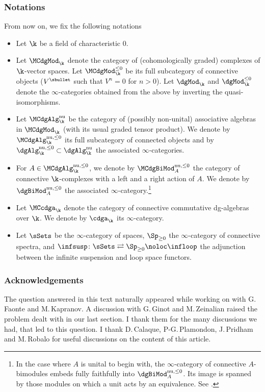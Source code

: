 \subsubsection*{Notations}
From now on, we fix the following notations
\begin{itemize}
\item Let $\k$ be a field of characteristic $0$.
\item Let $\MCdgMod_\k$ denote the category of (cohomologically graded) complexes of $\k$\nobreakdash-vector spaces. Let $\MCdgMod_\k^{\leq 0}$ be its full subcategory of connective objects (\ie $V^\sbullet$ such that $V^n = 0$ for $n > 0$).
Let $\dgMod_\k$ and $\dgMod_\k^{\leq 0}$ denote the $\infty$-categories obtained from the above by inverting the quasi-isomorphisms.
\item Let $\MCdgAlg_\k^{\mathrm{nu}}$ be the category of (possibly non-unital) associative algebras in $\MCdgMod_\k$ (with its usual graded tensor product). We denote by $\MCdgAlg_\k^{\mathrm{nu},\leq 0}$ its full subcategory of connected objects and by $\dgAlg^{\mathrm{nu},\leq 0}_\k \subset \dgAlg_\k^{\mathrm{nu}}$ the associated $\infty$\nobreakdash-categories.
\item For $A \in \MCdgAlg_\k^{\mathrm{nu},\leq 0}$, we denote by $\MCdgBiMod_A^{\mathrm{nu},\leq 0}$ the category of connective $\k$-complexes with a left and a right action of $A$. We denote by $\dgBiMod^{\mathrm{nu},\leq 0}_A$ the associated $\infty$-category.\footnote{In the case where $A$ is unital to begin with, the $\infty$-category of connective $A$-bimodules embeds fully faithfully into $\dgBiMod^{\mathrm{nu},\leq 0}_A$. Its image is spanned by those modules on which a unit acts by an equivalence. See \cite[5.4.3.5 \& 5.4.3.14]{lurie:halg}.}
\item Let $\MCcdga_\k$ denote the category of connective commutative dg-algebras over $\k$. We denote by $\cdga_\k$ its $\infty$-category.
\item Let $\sSets$ be the $\infty$-category of spaces, $\Sp_{\geq 0}$ the $\infty$-category of connective spectra, and $\infsusp \colon \sSets \rightleftarrows \Sp_{\geq 0} \noloc \infloop$ the adjunction between the infinite suspension and loop space functors.
\end{itemize}

\subsubsection*{Acknowledgements}
The question answered in this text naturally appeared while working on \cite{faontehennionkapranov:kacmoody} with G.\,Faonte and M.\,Kapranov.
A discussion with G.\,Ginot and M.\,Zeinalian raised the problem dealt with in our last section. I thank them for the many discussions we had, that led to this question.
I thank D.\,Calaque, P\nobreakdash-G.\,Plamondon, J.\,Pridham and M.\,Robalo for useful discussions on the content of this article.

